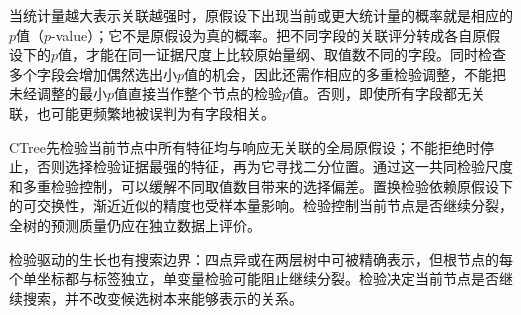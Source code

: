 当统计量越大表示关联越强时，原假设下出现当前或更大统计量的概率就是相应的$p$值（$p$-value）；它不是原假设为真的概率。把不同字段的关联评分转成各自原假设下的$p$值，才能在同一证据尺度上比较原始量纲、取值数不同的字段。同时检查多个字段会增加偶然选出小$p$值的机会，因此还需作相应的多重检验调整，不能把未经调整的最小$p$值直接当作整个节点的检验$p$值。否则，即使所有字段都无关联，也可能更频繁地被误判为有字段相关。

CTree先检验当前节点中所有特征均与响应无关联的全局原假设；不能拒绝时停止，否则选择检验证据最强的特征，再为它寻找二分位置。通过这一共同检验尺度和多重检验控制，可以缓解不同取值数目带来的选择偏差。置换检验依赖原假设下的可交换性，渐近近似的精度也受样本量影响。检验控制当前节点是否继续分裂，全树的预测质量仍应在独立数据上评价。

检验驱动的生长也有搜索边界：四点异或在两层树中可被精确表示，但根节点的每个单坐标都与标签独立，单变量检验可能阻止继续分裂。检验决定当前节点是否继续搜索，并不改变候选树本来能够表示的关系。


